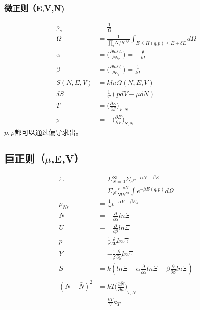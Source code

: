 \documentclass[a4paper,12pt]{article}
\newcommand{\myPartial}[3]{{\bigg(\frac{\partial {#1}}{\partial {#2}}\bigg)}_{#3}}
\begin{document}
\begin{CJK*}{UTF8}{gbsn}
\begin{spacing}{1.3}
\subsubsection{微正则（E,V,N)}
\begin{align}
  \rho_s &= \frac{1}{\Omega}\\
  \Omega &= \frac{1}{\prod_i N_i!h^{N_i r}}\int_{E\leq H(q,p)\leq E+\delta E} d\Omega\\
  \alpha &= \myPartial{ln\Omega_r}{N_r}{} = -\frac{\mu}{kT}\\
  \beta &= \myPartial{ln\Omega_r}{E_r}{}  = \frac{1}{kT}\\
  S(N,E,V) &= kln\Omega (N,E,V)\\
  dS&= \frac{1}{T}(pdV - \mu dN)\\
  T &= \bigg(\frac{\partial E}{\partial S}\bigg)_{V,N}\\
  p &= -\bigg(\frac{\partial E}{\partial V}\bigg)_{S,N}
\end{align}
\indent $p,\mu$都可以通过偏导求出。
\subsection{巨正则（$\mu$,E,V）}
\begin{align}
  \Xi &= \Sigma_{N=0}^\infty \Sigma_s e^{-\alpha N -\beta E}\\
      &= \Sigma_{N}\frac{e^{-\alpha N}}{N!h^{Nr}}\int e^{-\beta E(q,p)}d\Omega\\
  \rho_{Ns} &= \frac{1}{\Xi}e^{-\alpha V-\beta E_s}\\
  \bar{N} &= -\frac{\partial}{\partial \alpha}ln\Xi\\
  U &= -\frac{\partial}{\partial \beta}ln\Xi\\
  p &= \frac{1}{\beta}\frac{\partial}{\partial V}ln\Xi\\
  Y &= -\frac{1}{\beta}\frac{\partial}{\partial y}ln\Xi\\
  S &= k(ln\Xi - \alpha \frac{\partial}{\partial \alpha}ln\Xi - \beta\frac{\partial}{\partial \beta}ln\Xi)\\
  \overline{(N-\bar{N})^2} &= kT\myPartial{\bar{N}}{\mu}{T,N}\\
  &= \frac{kT}{V}\kappa_T
\end{align}


\end{spacing}
\end{CJK*}
\end{document}
